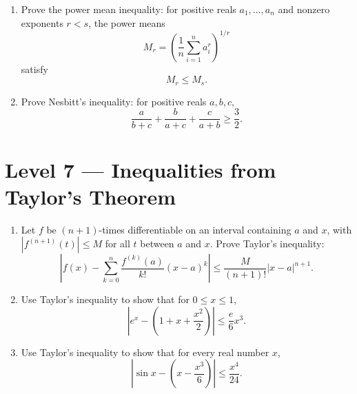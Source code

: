 \documentclass{essay}
\begin{document}
\begin{enumerate}[resume]
    \item Prove the power mean inequality: for positive reals \(a_1,\dots,a_n\) and nonzero exponents \(r<s\), the power means
    \[
        M_r=\left(\frac{1}{n}\sum_{i=1}^n a_i^r\right)^{\!1/r}
    \]
    satisfy
    \[
        M_r \le M_s.
    \]

    \item Prove Nesbitt's inequality: for positive reals \(a,b,c\),
    \[
        \frac{a}{b+c}+\frac{b}{a+c}+\frac{c}{a+b}
        \ge
        \frac{3}{2}.
    \]
\end{enumerate}

\section*{Level 7 --- Inequalities from Taylor's Theorem}

\begin{enumerate}[resume]

    \item Let \(f\) be \((n+1)\)-times differentiable on an interval containing \(a\) and \(x\), with \(|f^{(n+1)}(t)|\le M\) for all \(t\) between \(a\) and \(x\). Prove Taylor's inequality:
    \[
        \left|
        f(x) - \sum_{k=0}^{n}\frac{f^{(k)}(a)}{k!}(x-a)^k
        \right|
        \le
        \frac{M}{(n+1)!}|x-a|^{n+1}.
    \]

    \item Use Taylor's inequality to show that for \(0\le x\le1\),
    \[
        \left|
        e^x - \left(1+x+\frac{x^2}{2}\right)
        \right|
        \le
        \frac{e}{6}x^3.
    \]

    \item Use Taylor's inequality to show that for every real number \(x\),
    \[
        \left|
        \sin x - \left(x-\frac{x^3}{6}\right)
        \right|
        \le
        \frac{x^4}{24}.
    \]
\end{enumerate}
\end{document}
